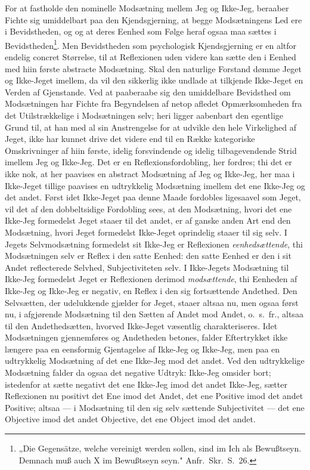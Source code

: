 \documentclass[12pt]{book}
\newcommand{\opage}[1]{\marginnote{\footnotesize\textit{[#1]}}}
\begin{document}
For at fastholde den nominelle Modsætning mellem Jeg og Ikke-Jeg, beraaber Fichte
sig umiddelbart paa den Kjendsgjerning, at begge Modsætningens Led ere i
Bevidstheden, og og at deres Eenhed som Følge heraf ogsaa maa sættes i
\opage{69} Bevidstheden\footnote{„Die Gegensätze, welche vereinigt werden sollen, sind im Ich
als Bewußtseyn. Demnach muß auch X im Bewußtseyn seyn." Anfr.\ Skr.\ S.~26.}. Men
Bevidstheden som psychologisk Kjendsgjerning er en altfor endelig concret Størrelse,
til at Reflexionen uden videre kan sætte den i Eenhed med hiin første abstracte
Modsætning. Skal den naturlige Forstand dømme Jeget og Ikke-Jeget imellem, da vil
den sikkerlig ikke undlade at tilkjende Ikke-Jeget en Verden af Gjenstande. Ved at
paaberaabe sig den umiddelbare Bevidsthed om Modsætningen har Fichte fra
Begyndelsen af netop afledet Opmærksomheden fra det Utilstrækkelige i Modsætningen
selv; heri ligger aabenbart den egentlige Grund til, at han med al sin Anstrengelse
for at udvikle den hele Virkelighed af Jeget, ikke har kunnet drive det videre end
til en Række kategoriske Omskrivninger af hiin første, idelig forsvindende og idelig
tilbagevendende Strid imellem Jeg og Ikke-Jeg. Det er en Reflexionsfordobling, her
fordres; thi det er ikke nok, at her paavises en abstract Modsætning af Jeg og
Ikke-Jeg, her maa i Ikke-Jeget tillige paavises en udtrykkelig Modsætning imellem
det ene Ikke-Jeg og det andet. Først idet Ikke-Jeget paa denne Maade fordobles
ligesaavel som Jeget, vil det af den dobbeltsidige Fordobling sees, at den
Modsætning, hvori det ene Ikke-Jeg formedelst Jeget staaer til det andet, er af
ganske anden Art end den Modsætning, hvori Jeget formedelst Ikke-Jeget oprindelig
staaer til sig selv. I Jegets Selvmodsætning formedelst sit Ikke-Jeg er Reflexionen
\emph{eenhedsættende}, thi Modsætningen selv er Reflex i den satte Eenhed: den satte
Eenhed er den i sit Andet reflecterede Selvhed, Subjectiviteten selv. I Ikke-Jegets
Modsætning til Ikke-Jeg formedelst Jeget er Reflexionen derimod \emph{modsættende},
thi Eenheden af Ikke-Jeg og Ikke-Jeg er negativ, en Reflex i den sig fortsættende
\opage{70} Andethed. Den Selvsætten, der udelukkende gjælder for Jeget, staaer altsaa nu, men
ogsaa først nu, i afgjørende Modsætning til den Sætten af Andet mod Andet, o.\ s.\
fr., altsaa til den Andethedsætten, hvorved Ikke-Jeget væsentlig charakteriseres.
Idet Modsætningen gjennemføres og Andetheden betones, falder Eftertrykket ikke
længere paa en eensformig Gjentagelse af Ikke-Jeg og Ikke-Jeg, men paa en
udtrykkelig Modsætning af det ene Ikke-Jeg mod det andet. Ved den udtrykkelige
Modsætning falder da ogsaa det negative Udtryk: Ikke-Jeg omsider bort; istedenfor at
sætte negativt det ene Ikke-Jeg imod det andet Ikke-Jeg, sætter Reflexionen nu
positivt det Ene imod det Andet, det ene Positive imod det andet Positive; altsaa
--- i Modsætning til den sig selv sættende Subjectivitet --- det ene Objective imod
det andet Objective, det ene Object imod det andet.
\end{document}
